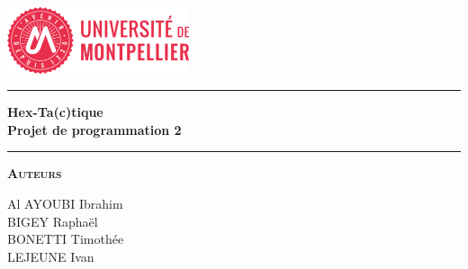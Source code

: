 \begin{titlepage}
\begin{center}
\vspace{2cm}
\includegraphics[width=0.4\textwidth]{root/UM1.png}~\\[1cm]
\vspace{2cm}

\hrule
\vspace{.5cm}
{\huge\bfseries{Hex-Ta(c)tique\\Projet de programmation 2}} %
\vspace{.5cm}

\hrule
\vspace{1.5cm}

\textsc{\textbf{Auteurs}}\\
\vspace{.5cm}
\centering

Al AYOUBI Ibrahim\\
BIGEY Raphaël\\
BONETTI Timothée\\
LEJEUNE Ivan\\

\vspace{4cm}

\centering {} %
\end{center}
\end{titlepage}